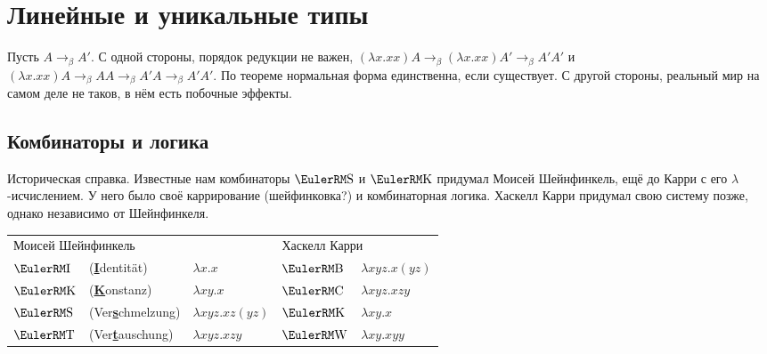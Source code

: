 \section{\texorpdfstring{Линейные и уникальные типы}{Linear and unique types}}

Пусть $A \rightarrow_\beta A'$.
С одной стороны, порядок редукции не важен, %
$(\lambda x . x x) A \rightarrow_\beta (\lambda x . x x) A' \rightarrow_\beta A' A'$
и $(\lambda x . x x) A \rightarrow_\beta A A \rightarrow_\beta A' A \rightarrow_\beta A' A'$.
По теореме  нормальная форма единственна, если существует.
С другой стороны, реальный мир на самом деле не таков, в нём есть побочные эффекты.

\subsection{\texorpdfstring{Комбинаторы и логика}{Combinators and logic}}

Историческая справка. Известные нам комбинаторы $\comb S$ и $\comb K$ придумал Моисей Шейнфинкель,
ещё до Карри с его $\lambda$-исчислением.
У него было своё каррирование (шейфинковка?) и комбинаторная логика.
Хаскелл Карри придумал свою систему позже, однако независимо от Шейнфинкеля.

\begin{center} \newcommand{\eemph}[1]{\underline{\textbf{#1}}}
\begin{tabular}{l l l l l} \toprule
    \multicolumn{3}{l}{Моисей Шейнфинкель} & \multicolumn{2}{l}{Хаскелл Карри} \\ \cmidrule(lr){1-3} \cmidrule(lr){4-5}
    $\comb I$ & (\eemph{I}dentität)     & $\lambda x . x$             & $\comb B$ & $\lambda x y z . x (y z)$ \\
    $\comb K$ & (\eemph{K}onstanz)      & $\lambda x y . x$           & $\comb C$ & $\lambda x y z . x z y$   \\
    $\comb S$ & (Ver\eemph{s}chmelzung) & $\lambda x y z . x z (y z)$ & $\comb K$ & $\lambda x y . x$         \\
    $\comb T$ & (Ver\eemph{t}auschung)  & $\lambda x y z . x z y$     & $\comb W$ & $\lambda x y . x y y$ \\ \bottomrule
\end{tabular} %
\end{center}

